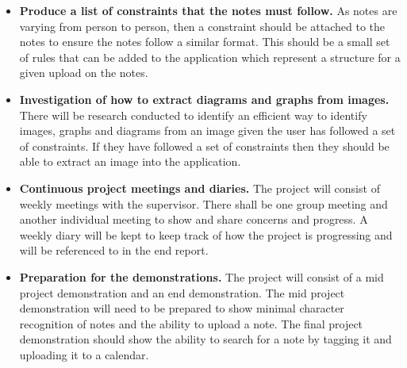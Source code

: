 \documentclass[11pt,fleqn,twoside]{article}
\begin{document}
\begin{itemize}
\begin{itemize}
  \end{itemize}

\item \textbf{Produce a list of constraints that the notes must follow.} As notes are varying from person to person, then a constraint should be attached to the notes to ensure the notes follow a similar format. This should be a small set of rules that can be added to the application which represent a structure for a given upload on the notes.

\item \textbf{Investigation of how to extract diagrams and graphs from images.} There will be research conducted to identify an efficient way to identify images, graphs and diagrams from an image given the user has followed a set of constraints. If they have followed a set of constraints then they should be able to extract an image into the application.

\item \textbf{Continuous project meetings and diaries.} The project will consist of weekly meetings with the supervisor. There shall be one group meeting and another individual meeting to show and share concerns and progress. A weekly diary will be kept to keep track of how the project is progressing and will be referenced to in the end report.

\item \textbf{Preparation for the demonstrations.} The project will consist of a mid project demonstration and an end demonstration. The mid project demonstration will need to be prepared to show minimal character recognition of notes and the ability to upload a note. The final project demonstration should show the ability to search for a note by tagging it and uploading it to a calendar. 

\end{itemize}

\end{document}
